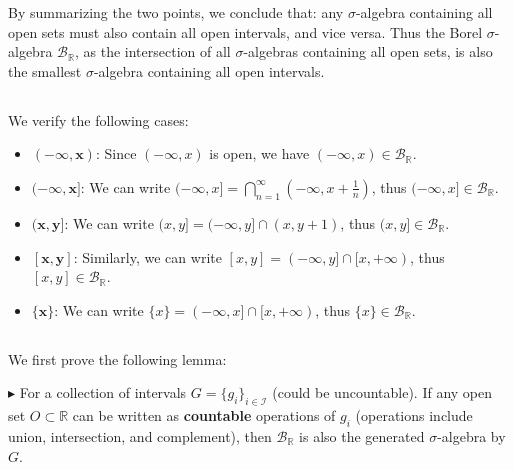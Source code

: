 \documentclass[11pt,a4paper]{article}
\numberwithin{equation}{section}%
\newenvironment{point}{\raggedright$\blacktriangleright$}{}
\begin{document}
By summarizing the two points, we conclude that: any $ \sigma $-algebra containing all open sets must also contain all open intervals, and vice versa. Thus the Borel $ \sigma $-algebra $ \mathcal{B}_\mathbb{R} $, as the intersection of all $ \sigma $-algebras containing all open sets, is also the smallest $ \sigma $-algebra containing all open intervals.


\subsection{}

We verify the following cases:
\begin{itemize}[topsep=2pt,itemsep=0pt]
    \item $ \mathbf{(-\infty, x)} $: Since $ (-\infty, x) $ is open, we have $ (-\infty, x)\in \mathcal{B}_{\mathbb{R}} $.
    \item $ \mathbf{(-\infty,x]} $: We can write $ (-\infty,x] = \bigcap_{n=1}^\infty (-\infty,x+\frac{1}{n}) $, thus $ (-\infty,x]\in \mathcal{B}_{\mathbb{R}} $.

    \item $ \mathbf{(x,y]}$: We can write $ (x,y] = (-\infty,y] \cap (x,y+1) $, thus $ (x,y]\in \mathcal{B}_{\mathbb{R}} $.
    \item $ \mathbf{[x,y]} $: Similarly, we can write $ [x,y] = (-\infty,y] \cap [x,+\infty) $, thus $ [x,y]\in \mathcal{B}_{\mathbb{R}} $.
    \item $ \mathbf{\{x\}} $: We can write $ \{x\} = (-\infty,x] \cap [x,+\infty) $, thus $ \{x\}\in \mathcal{B}_{\mathbb{R}} $.
\end{itemize}

\subsection{}

We first prove the following lemma:

\begin{point}
    For a collection of intervals $ G=\{g_i\}_{i\in\mathcal{I}} $ (could be uncountable). If any open set $ O\subset \mathbb{R} $ can be written as \textbf{countable} operations of $ g_i $ (operations include union, intersection, and complement), then $ \mathcal{B}_\mathbb{R} $ is also the generated $ \sigma $-algebra by $ G $.
\end{point}
\end{document}
